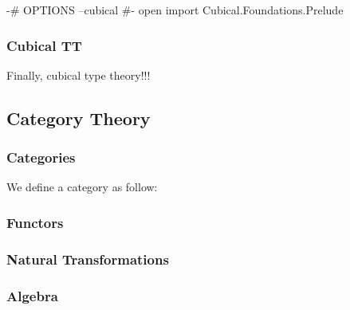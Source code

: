 \begin{code}[hide]
{-# OPTIONS --cubical #-}
open import Cubical.Foundations.Prelude
\end{code}

\subsubsection*{Cubical TT}

Finally, cubical type theory!!!

\subsection{Category Theory}

\subsubsection*{Categories}

We define a category as follow:



\subsubsection*{Functors}


\subsubsection*{Natural Transformations}


\subsubsection*{Algebra}

